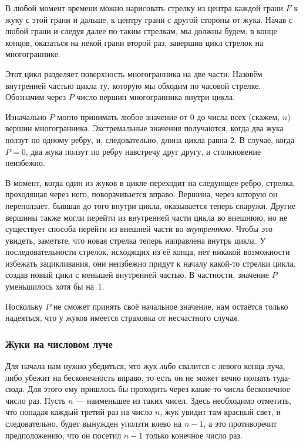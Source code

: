 В любой момент времени можно нарисовать стрелку из центра каждой грани $F$ к жуку с этой грани и дальше, к центру грани с другой стороны от жука.
Начав с любой грани и следуя далее по таким стрелкам, мы должны будем, в конце концов, оказаться на некой грани второй раз, завершив цикл стрелок на многограннике.

Этот цикл разделяет поверхность многогранника на две части.
Назовём внутренней частью цикла ту, которую мы обходим по часовой стрелке.
Обозначим через $P$ число вершин многогранника внутри цикла.

Изначально $P$ могло принимать любое значение от $0$ до числа всех (скажем, $n$) вершин многогранника.
Экстремальные значения получаются, когда два жука ползут по одному ребру, и, следовательно, длина цикла равна $2$.
В случае, когда $P=0$, два жука ползут по ребру навстречу друг другу, и столкновение неизбежно.

В момент, когда один из жуков в цикле переходит на следующее ребро, стрелка, проходящая через него, поворачивается вправо.
Вершина, через которую он переползает, бывшая до того внутри цикла, оказывается теперь снаружи.
Другие вершины также могли перейти из внутренней части цикла во внешнюю, но не существует способа перейти из внешней части во \emph{внутреннюю}.
Чтобы это увидеть, заметьте, что новая стрелка теперь направлена внутрь цикла.
У последовательности стрелок, исходящих из её конца, нет никакой возможности избежать зацикливания, они неизбежно придут к началу какой-то стрелки цикла, создав новый цикл с меньшей внутренней частью.
В частности, значение $P$ уменьшилось хотя бы на~$1$.

{

\sloppy

Поскольку $P$ не сможет принять своё начальное значение, нам остаётся только надеяться, что у жуков имеется страховка от несчастного случая.
\heart

}

\subsubsection*{Жуки на числовом луче}%

Для начала нам нужно убедиться, что жук \emph{либо} свалится с левого конца луча, либо убежит на бесконечность вправо, то есть он не может вечно ползать туда-сюда.
Для этого ему пришлось бы проходить через какие-то числа бесконечное число раз.
Пусть $n$ --- наименьшее из таких чисел.
Здесь необходимо отметить, что попадая каждый третий раз на число $n$, жук увидит там красный свет, и следовательно, будет вынужден уползти влево на $n-1$, а это противоречит предположению, что он посетил $n-1$ только конечное число раз.

